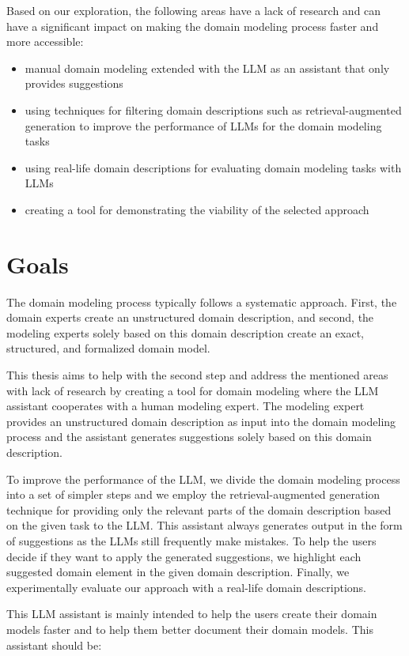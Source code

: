 Based on our exploration, the following areas have a lack of research and can have a significant impact on making the domain modeling process faster and more accessible:

\begin{itemize}
\item manual domain modeling extended with the LLM as an assistant that only provides suggestions
\item using techniques for filtering domain descriptions such as retrieval-augmented generation to improve the performance of LLMs for the domain modeling tasks
\item using real-life domain descriptions for evaluating domain modeling tasks with LLMs
\item creating a tool for demonstrating the viability of the selected approach
\end{itemize}


\section*{Goals}

The domain modeling process typically follows a systematic approach. First, the domain experts create an unstructured domain description, and second, the modeling experts solely based on this domain description create an exact, structured, and formalized domain model.

This thesis aims to help with the second step and address the mentioned areas with lack of research by creating a tool for domain modeling where the LLM assistant cooperates with a human modeling expert. The modeling expert provides an unstructured domain description as input into the domain modeling process and the assistant generates suggestions solely based on this domain description.

To improve the performance of the LLM, we divide the domain modeling process into a set of simpler steps and we employ the retrieval-augmented generation technique for providing only the relevant parts of the domain description based on the given task to the LLM. This assistant always generates output in the form of suggestions as the LLMs still frequently make mistakes. To help the users decide if they want to apply the generated suggestions, we highlight each suggested domain element in the given domain description. Finally, we experimentally evaluate our approach with a real-life domain descriptions.

This LLM assistant is mainly intended to help the users create their domain models faster and to help them better document their domain models. This assistant should be:

